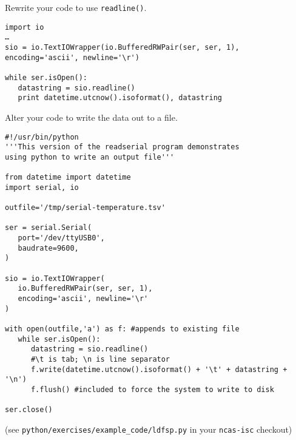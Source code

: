 \documentclass[a4paper,11pt]{article}
\begin{document}
\begin{question}
Rewrite your code to use \texttt{readline()}.
\end{question}
\newsavebox\readlinebox
\begin{lrbox}{\readlinebox}
\begin{minipage}{\textwidth}
\begin{verbatim}
import io
…
sio = io.TextIOWrapper(io.BufferedRWPair(ser, ser, 1), encoding='ascii', newline='\r')

while ser.isOpen():
   datastring = sio.readline()
   print datetime.utcnow().isoformat(), datastring
\end{verbatim}
\end{minipage}
\end{lrbox}

\begin{solution}
\noindent\usebox\readlinebox
\end{solution}
\begin{question}
Alter your code to write the data out to a file.
\end{question}

\newsavebox\logfile
\begin{lrbox}{\logfile}
\begin{minipage}{\textwidth}
\begin{verbatim}
#!/usr/bin/python
'''This version of the readserial program demonstrates
using python to write an output file'''

from datetime import datetime
import serial, io

outfile='/tmp/serial-temperature.tsv'

ser = serial.Serial(
   port='/dev/ttyUSB0',
   baudrate=9600,
)

sio = io.TextIOWrapper(
   io.BufferedRWPair(ser, ser, 1),
   encoding='ascii', newline='\r'
)

with open(outfile,'a') as f: #appends to existing file
   while ser.isOpen():
      datastring = sio.readline()
      #\t is tab; \n is line separator
      f.write(datetime.utcnow().isoformat() + '\t' + datastring + '\n')
      f.flush() #included to force the system to write to disk

ser.close()
\end{verbatim}
\end{minipage}
\end{lrbox}
\newpage
\begin{solution}
\noindent\usebox\logfile
\par
(see \texttt{python/exercises/example\_code/ldfsp.py} in your \texttt{ncas-isc} checkout)
\end{solution}
\newpage
\printsolutions
\newpage
\end{document}

